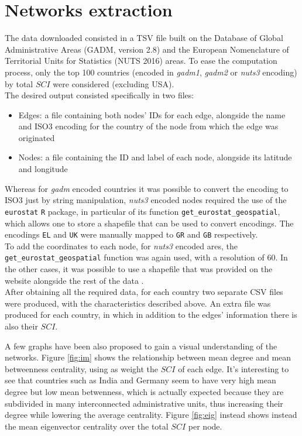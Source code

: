 \section{Networks extraction}

The data downloaded \cite{facebook_sci} consisted in a TSV file built on the Database of Global Administrative Areas (GADM, version 2.8) and the European Nomenclature of Territorial Units for Statistics (NUTS 2016) areas. To ease the computation process, only the top 100 countries (encoded in \textit{gadm1}, \textit{gadm2} or \textit{nuts3} encoding) by total $SCI$ were considered (excluding USA). \\
The desired output consisted specifically in two files:
\begin{itemize}
    \item Edges: a file containing both nodes' IDs for each edge, alongside the name and ISO3 encoding for the country of the node from which the edge was originated
    \item Nodes: a file containing the ID and label of each node, alongside its latitude and longitude 
\end{itemize}

Whereas for \textit{gadm} encoded countries it was possible to convert the encoding to ISO3 just by string manipulation, \textit{nuts3} encoded nodes required the use of the \texttt{eurostat} \texttt{R} package, in particular of its function \texttt{get\_eurostat\_geospatial}, which allows one to store a shapefile that can be used to convert encodings. The encodings \texttt{EL} and \texttt{UK} were manually mapped to \texttt{GR} and \texttt{GB} respectively. \\
To add the coordinates to each node, for \textit{nuts3} encoded ares, the \texttt{get\_eurostat\_geospatial} function was again used, with a resolution of 60. In the other cases, it was possible to use a shapefile that was provided on the website alongside the rest of the data \cite{facebook_sci}. \\
After obtaining all the required data, for each country two separate CSV files were produced, with the characteristics described above. An extra file was produced for each country, in which in addition to the edges' information there is also their $SCI$.

A few graphs have been also proposed to gain a visual understanding of the networks. Figure \ref{fig:im} shows the relationship between mean degree and mean betweenness centrality, using as weight the $SCI$ of each edge. It's interesting to see that countries such as India and Germany seem to have very high mean degree but low mean betwenness, which is actually expected because they are subdivided in many interconnected administrative units, thus increasing their degree while lowering the average centrality. Figure \ref{fig:eig} instead shows instead the mean eigenvector centrality over the total $SCI$ per node. 

